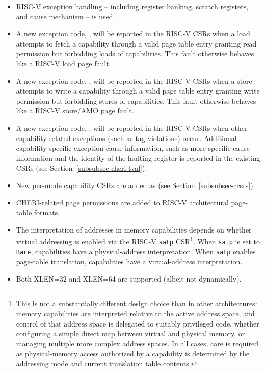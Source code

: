 \begin{itemize}
\item RISC-V exception handling -- including register banking, scratch
  registers, and cause mechanism -- is used.
\item A new exception code, \riscvloadcappagefault{}, will be
  reported in the RISC-V \xcause{} CSRs when a load attempts to fetch a
  capability through a valid page table entry granting read permission but
  forbidding loads of capabilities.  This fault otherwise behaves like a RISC-V
  load page fault.
\item A new exception code, \riscvstorecappagefault{}, will be
  reported in the RISC-V \xcause{} CSRs when a store attempts to write a
  capability through a valid page table entry granting write permission but
  forbidding stores of capabilities.  This fault otherwise behaves like a
  RISC-V store/AMO page fault.
\item A new exception code, \riscvcheriexception{}, will be
  reported in the RISC-V \xcause{} CSRs when other
  capability-related exceptions (such as tag violations) occur.
  Additional capability-specific exception cause information, such
  as more specific cause information and the identity of the faulting
  register is reported in the existing \xtval{} CSRs (see
  Section~\ref{subsubsec-cheri-tval}).
\item New per-mode capability CSRs are added as \xccsr{} (see
  Section~\ref{subsubsec-ccsrs}).
\item CHERI-related page permissions are added to RISC-V architectural
  page-table formats.
\item The interpretation of addresses in memory capabilities
  depends on whether virtual addressing is enabled via the RISC-V
  \texttt{satp} CSR\footnote{This is not a substantially different design
  choice than in other architectures: memory
  capabilities are interpreted relative to the active address space, and
  control of that address space is delegated to suitably privileged code,
  whether configuring a simple direct map between virtual and physical memory,
  or managing multiple more complex address spaces.
  In all cases, care is required as physical-memory access authorized by a
  capability is determined by the addressing mode and current translation
  table contents.}.
  When \texttt{satp} is set to \texttt{Bare}, capabilities have a
  physical-address interpretation.
  When \texttt{satp} enables page-table translation, capabilities have a
  virtual-address interpretation.
\item Both XLEN=32 and XLEN=64 are supported (albeit not dynamically).

\end{itemize}
